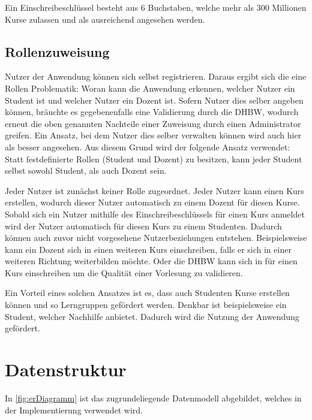 Ein Einschreibeschlüssel besteht aus 6 Buchstaben, welche mehr als 300 Millionen Kurse zulassen und als ausreichend angesehen werden.


\subsection{Rollenzuweisung} %
Nutzer der Anwendung können sich selbst registrieren.
Daraus ergibt sich die eine Rollen Problematik: Woran kann die Anwendung erkennen, welcher Nutzer ein Student ist und welcher Nutzer ein Dozent ist.
Sofern Nutzer dies selber angeben können, bräuchte es gegebenenfalls eine Validierung durch die DHBW, wodurch erneut die oben genannten Nachteile einer Zuweisung durch einen Administrator greifen.
Ein Ansatz, bei dem Nutzer dies selber verwalten können wird auch hier als besser angesehen.
Aus diesem Grund wird der folgende Ansatz verwendet:
Statt festdefinierte Rollen (Student und Dozent) zu besitzen, kann jeder Student selbst sowohl Student, als auch Dozent sein.

Jeder Nutzer ist zunächst keiner Rolle zugeordnet.
Jeder Nutzer kann einen Kurs erstellen, wodurch dieser Nutzer automatisch zu einem Dozent für diesen Kurse.
Sobald sich ein Nutzer mithilfe des Einschreibeschlüssels für einen Kurs anmeldet wird der Nutzer automatisch für diesen Kurs zu einem Studenten.
Dadurch können auch zuvor nicht vorgesehene Nutzerbeziehungen entstehen.
Beispielsweise kann ein Dozent sich in einen weiteren Kurs einschreiben, falls er sich in einer weiteren Richtung weiterbilden möchte.
Oder die DHBW kann sich in für einen Kurs einschreiben um die Qualität einer Vorlesung zu validieren.


Ein Vorteil eines solchen Ansatzes ist es, dass auch Studenten Kurse erstellen können und so Lerngruppen gefördert werden.
Denkbar ist beispielsweise ein Student, welcher Nachhilfe anbietet.
Dadurch wird die Nutzung der Anwendung gefördert.







\section{Datenstruktur} %
In \autoref{fig:erDiagramm} ist das zugrundeliegende Datenmodell abgebildet, welches in der Implementierung verwendet wird.

